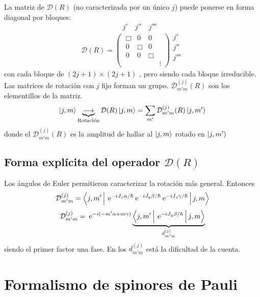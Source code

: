 \documentclass[10pt,oneside]{CBFT_book}
\begin{document}
La matriz de $\mathcal{D}(R)$ (no caracterizada por un único $j$) puede ponerse en forma diagonal por bloques:
\[
\begin{matrix} \qquad j' \quad j'' \quad j''' \end{matrix}
\]
\[
	\mathcal{D}(R) = \begin{pmatrix}
	\; \Box & 0 & 0 & \\
	\; 0 & \Box & 0 & \\
	\; 0 & 0 & \Box & \\
	\; & & & \vdots
	\end{pmatrix} \begin{matrix} j' \\ j'' \\ j'''\\ \\ \end{matrix}
\]
con cada bloque de $(2j+1)\times(2j+1)$ , pero siendo cada bloque irreducible. Las matrices de rotación con 
$j$ fijo forman un grupo. $\mathcal{D}_{m'm}^{(j)}(R)$ son los elementillos de la matriz.
\[
	\Ket{j,m} \underbrace{\longrightarrow}_{\text{Rotación}} \mathcal{D}(R)\Ket{j,m} =
	 \sum_{m'} \mathcal{D}^{(j)}_{m' m}(R) \Ket{j,m'} 
\]
donde el $\mathcal{D}^{(j)}_{m' m}(R)$ es la amplitud de hallar al $\Ket{j,m}$ rotado en $\Ket{j,m'}$

\subsection{Forma explícita del operador $\mathcal{D}(R)$}

Los ángulos de Euler permitieron caracterizar la rotación más general. Entonces 
\[
	\mathcal{D}^{(j)}_{m' m} = 
	\Braket{j,m'|\:\mathrm{e}^{-iJ_z\alpha/\hbar} \:\mathrm{e}^{-iJ_y\beta/\hbar} \:\mathrm{e}^{-iJ_z\gamma/\hbar} |j,m}
\]
\[
	\mathcal{D}^{(j)}_{m' m} = \:\mathrm{e}^{-i(-m'\alpha + m\gamma)}
	\underbrace{\Braket{j,m'| \:\mathrm{e}^{-iJ_y\beta/\hbar}  |j,m}}_{d_{m'm}^{(j)}}
\]
siendo el primer factor una fase.
En los $d_{m'm}^{(j)}$ está la dificultad de la cuenta.

\section{Formalismo de spinores de Pauli}
\end{document}
